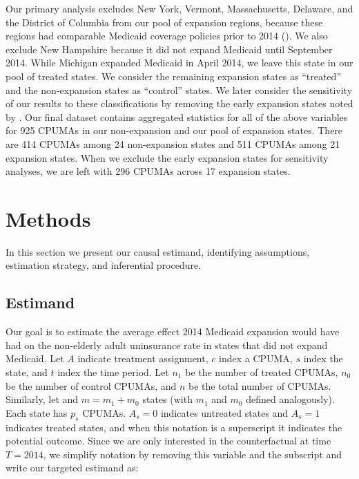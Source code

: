 \documentclass[aoas]{imsart}
\theoremstyle{plain}
\theoremstyle{remark}
\begin{document}
Our primary analysis excludes New York, Vermont, Massachusetts, Delaware, and the District of Columbia from our pool of expansion regions, because these regions had comparable Medicaid coverage policies prior to 2014 (\cite{kaestner2017effects}). We also exclude New Hampshire because it did not expand Medicaid until September 2014. While Michigan expanded Medicaid in April 2014, we leave this state in our pool of treated states. We consider the remaining expansion states as ``treated'' and the non-expansion states as ``control'' states. We later consider the sensitivity of our results to these classifications by removing the early expansion states noted by \cite{frean2017premium}. Our final dataset contains aggregated statistics for all of the above variables for 925 CPUMAs in our non-expansion and our pool of expansion states. There are 414 CPUMAs among 24 non-expansion states and 511 CPUMAs among 21 expansion states. When we exclude the early expansion states for sensitivity analyses, we are left with 296 CPUMAs across 17 expansion states.

\section{Methods}\label{sec:methods}

In this section we present our causal estimand, identifying assumptions, estimation strategy, and inferential procedure.

\subsection{Estimand} \label{ssec:estimand}

Our goal is to estimate the average effect 2014 Medicaid expansion would have had on the non-elderly adult uninsurance rate in states that did not expand Medicaid. Let $A$ indicate treatment assignment, $c$ index a CPUMA, $s$ index the state, and $t$ index the time period. Let $n_1$ be the number of treated CPUMAs, $n_0$ be the number of control CPUMAs, and $n$ be the total number of CPUMAs. Similarly, let and $m = m_1 + m_0$ states (with $m_1$ and $m_0$ defined analogously). Each state has $p_s$ CPUMAs. $A_s=0$ indicates untreated states and $A_s=1$ indicates treated states, and when this notation is a superscript it indicates the potential outcome. Since we are only interested in the counterfactual at time $T = 2014$, we simplify notation by removing this variable and the subscript and write our targeted estimand as:
\end{document}
